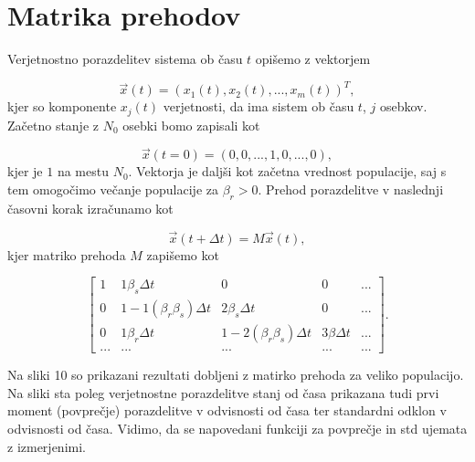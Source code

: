 \documentclass[slovene,11pt,a4paper]{article}
\begin{document}
\section{Matrika prehodov}

Verjetnostno porazdelitev sistema ob času $t$ opišemo z vektorjem

\begin{equation}
\vec{x}(t) = (x_1(t), x_2(t), ..., x_m(t))^T,
\end{equation}
kjer so komponente $x_j(t)$ verjetnosti, da ima sistem ob času $t$, $j$ osebkov. Začetno stanje z $N_0$ osebki bomo zapisali kot

\begin{equation}
\vec{x}(t=0) = (0, 0, ..., 1, 0, ..., 0),
\end{equation}
kjer je $1$ na mestu $N_0$. Vektorja je daljši kot začetna vrednost populacije, saj s tem omogočimo večanje populacije za $\beta_r > 0$. Prehod porazdelitve v naslednji časovni korak izračunamo kot

\begin{equation}
\vec{x}(t+\Delta t) = M\vec{x}(t),
\end{equation}
kjer matriko prehoda $M$ zapišemo kot

\begin{equation}
\begin{bmatrix}
1 & 1\beta_s \Delta t             & 0                             & 0               & ... \\
0 & 1-1(\beta_r \beta_s) \Delta t & 2\beta_s \Delta t             & 0               & ... \\
0 & 1\beta_r \Delta t             & 1-2(\beta_r \beta_s) \Delta t & 3\beta \Delta t & ... \\
... & ...                         & ...                           & ...             & ...
\end{bmatrix}
.
\end{equation}

Na sliki 10 so prikazani rezultati dobljeni z matirko prehoda za veliko populacijo. Na sliki sta poleg verjetnostne porazdelitve stanj od časa prikazana tudi prvi moment (povprečje) porazdelitve v odvisnosti od časa ter standardni odklon v odvisnosti od časa. Vidimo, da se napovedani funkciji za povprečje in std ujemata z izmerjenimi.

\newpage
\end{document}
